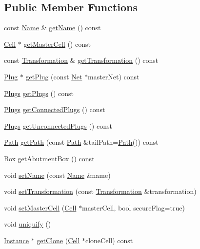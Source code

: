 \subsection*{Public Member Functions}
\begin{DoxyCompactItemize}
\item 
const \hyperlink{classHurricane_1_1Name}{Name} \& \hyperlink{classHurricane_1_1Instance_a8699381234cb33a4191b6f8a7ea299f6}{get\-Name} () const 
\item 
\hyperlink{classHurricane_1_1Cell}{Cell} $\ast$ \hyperlink{classHurricane_1_1Instance_a7625b60562f02cfc27a2b8ebecc8988a}{get\-Master\-Cell} () const 
\item 
const \hyperlink{classHurricane_1_1Transformation}{Transformation} \& \hyperlink{classHurricane_1_1Instance_abca4df2c8c5528a571b9f105cc5df8a6}{get\-Transformation} () const 
\item 
\hyperlink{classHurricane_1_1Plug}{Plug} $\ast$ \hyperlink{classHurricane_1_1Instance_a78dc84bdd573b10494a35c2b756e659b}{get\-Plug} (const \hyperlink{classHurricane_1_1Net}{Net} $\ast$master\-Net) const 
\item 
\hyperlink{namespaceHurricane_ac8335d2057483ee7a935c15a9460c64f}{Plugs} \hyperlink{classHurricane_1_1Instance_a0a247a8d493d327ce19d5a018c863a16}{get\-Plugs} () const 
\item 
\hyperlink{namespaceHurricane_ac8335d2057483ee7a935c15a9460c64f}{Plugs} \hyperlink{classHurricane_1_1Instance_aa00909ea4ca7ff06940f1c5af7334a6d}{get\-Connected\-Plugs} () const 
\item 
\hyperlink{namespaceHurricane_ac8335d2057483ee7a935c15a9460c64f}{Plugs} \hyperlink{classHurricane_1_1Instance_ac7c6832142f92f05fd3e20f3a810dd10}{get\-Unconnected\-Plugs} () const 
\item 
\hyperlink{classHurricane_1_1Path}{Path} \hyperlink{classHurricane_1_1Instance_a99b16d1a86c22093739a43dcb9748af1}{get\-Path} (const \hyperlink{classHurricane_1_1Path}{Path} \&tail\-Path=\hyperlink{classHurricane_1_1Path}{Path}()) const 
\item 
\hyperlink{classHurricane_1_1Box}{Box} \hyperlink{classHurricane_1_1Instance_a423c2fc2a38eaef5b93f9846c81369a3}{get\-Abutment\-Box} () const 
\item 
void \hyperlink{classHurricane_1_1Instance_ae3b67792d1659f1a20c6533b8843b905}{set\-Name} (const \hyperlink{classHurricane_1_1Name}{Name} \&name)
\item 
void \hyperlink{classHurricane_1_1Instance_a8890d2e1b2ba2542997454297e63512f}{set\-Transformation} (const \hyperlink{classHurricane_1_1Transformation}{Transformation} \&transformation)
\item 
void \hyperlink{classHurricane_1_1Instance_a9f626fd058c21ffc2ed5bfee8d29a853}{set\-Master\-Cell} (\hyperlink{classHurricane_1_1Cell}{Cell} $\ast$master\-Cell, bool secure\-Flag=true)
\item 
void \hyperlink{classHurricane_1_1Instance_adf28fcd01f6ff89c5435e83482f66d4c}{uniquify} ()
\item 
\hyperlink{classHurricane_1_1Instance}{Instance} $\ast$ \hyperlink{classHurricane_1_1Instance_a7527747db0939ca21b1f819541d5923c}{get\-Clone} (\hyperlink{classHurricane_1_1Cell}{Cell} $\ast$clone\-Cell) const 
\end{DoxyCompactItemize}
